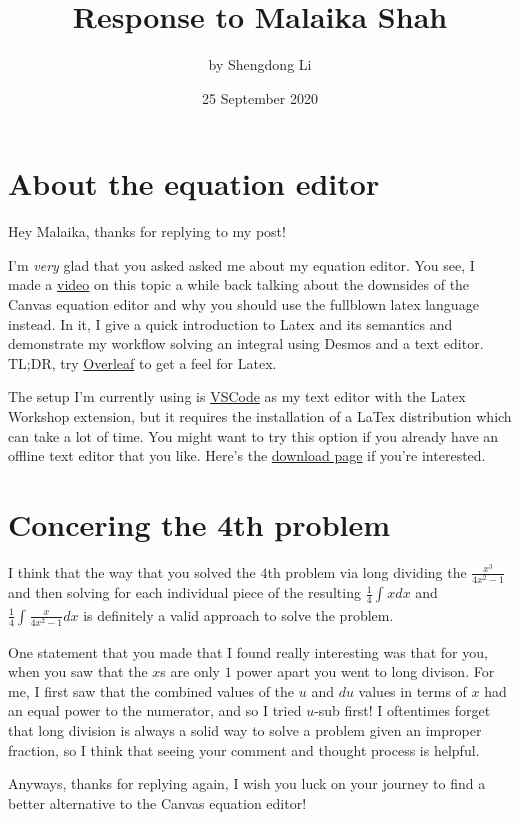 \documentclass[12pt]{article}
\begin{document}
\title{Response to Malaika Shah}
\author{by Shengdong Li}
\date{25 September 2020}
\maketitle

\section{About the equation editor}
Hey Malaika, thanks for replying to my post!

I'm \textit{very} glad that you asked asked me about my equation editor. You see, I made a \href{https://youtu.be/iH12bU1XLrk}{video} on this topic a while back talking about the downsides of the Canvas equation editor and why you should use the fullblown latex language instead. In it, I give a quick introduction to Latex and its semantics and demonstrate my workflow solving an integral using Desmos and a text editor. TL;DR, try \href{https://www.overleaf.com/}{Overleaf} to get a feel for Latex.

The setup I'm currently using is \href{https://code.visualstudio.com/}{VSCode} as my text editor with the Latex Workshop extension, but it requires the installation of a LaTex distribution which can take a lot of time. You might want to try this option if you already have an offline text editor that you like. Here's the \href{https://www.latex-project.org/get/}{download page} if you're interested.

\section{Concering the 4th problem}

I think that the way that you solved the $4$th problem via long dividing the $\frac{x^{3}}{4x^{2}-1}$ and then solving for each individual piece of the resulting $\frac{1}{4}\int_{ }^{ }xdx$ and $\frac{1}{4}\int_{ }^{ }\frac{x}{4x^{2}-1}dx$ is definitely a valid approach to solve the problem.

One statement that you made that I found really interesting was that for you, when you saw that the $x$s are only $1$ power apart you went to long divison. For me, I first saw that the combined values of the $u$ and $du$ values in terms of $x$ had an equal power to the numerator, and so I tried $u$-sub first! I oftentimes forget that long division is always a solid way to solve a problem given an improper fraction, so I think that seeing your comment and thought process is helpful.

Anyways, thanks for replying again, I wish you luck on your journey to find a better alternative to the Canvas equation editor!
\end{document}
